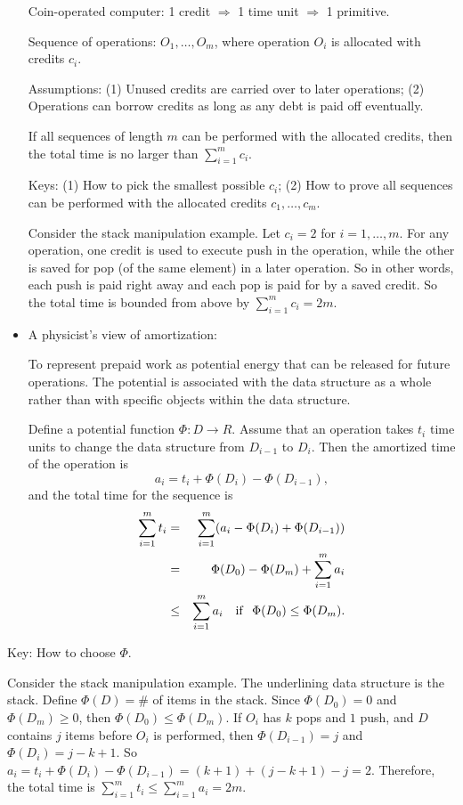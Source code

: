 \documentclass{article}
\begin{document}
\begin{itemize}
Coin-operated computer: 1 credit $\Rightarrow$ 1 time unit
$\Rightarrow$ 1 primitive.

Sequence of operations: $O_1, \ldots, O_m$, where operation $O_i$
is allocated with credits $c_i$.

Assumptions: (1) Unused credits are carried over to later operations;
(2) Operations can borrow credits as long as any debt is paid off
eventually.

If all sequences of length $m$ can be performed with the allocated credits,
then the total time is no larger than $\sum_{i=1}^m c_i$. 

Keys: (1) How to pick the smallest possible $c_i$; (2) How to prove
all sequences can be performed with the allocated credits $c_1,\ldots,c_m$.

Consider the stack manipulation example. Let $c_i=2$ for $i=1,\ldots,m$.
For any operation, one credit is used to execute push in the operation, 
while the other is saved for pop (of the same element) in a later
operation. So in other words, each push is paid right away and each
pop is paid for by a saved credit. So the total time is bounded
from above by $\sum_{i=1}^m c_i=2m$.

\item A physicist's view of amortization:

To represent prepaid work as potential energy that can be released for future
operations. The potential is associated with the data structure as a whole
rather than with specific objects within the data structure.

Define a potential function $\Phi: D\rightarrow R$. Assume that
an operation takes $t_i$ time units to change the data structure
from $D_{i-1}$ to $D_i$. Then the amortized time of the operation is
$$a_i=t_i+\Phi(D_i)-\Phi(D_{i-1}),$$ and the total time for the 
sequence is 
\begin{eqnarray*}
\sum_{i=1}^mt_i&=&\sum_{i=1}^m(a_i-\Phi(D_i)+\Phi(D_{i-1}))\\
&=&\Phi(D_0)-\Phi(D_m)+\sum_{i=1}^ma_i\\
&\le&\sum_{i=1}^ma_i{\rm \quad if\ \ }\Phi(D_0)\le\Phi(D_m).
\end{eqnarray*}
\end{itemize}

Key: How to choose $\Phi$.

Consider the stack manipulation example. The underlining data 
structure is the stack. Define $\Phi(D)=$\# of items in the 
stack. Since $\Phi(D_0)=0$ and $\Phi(D_m)\ge0$, then
$\Phi(D_0)\le\Phi(D_m)$.
If $O_i$ has $k$ pops and $1$ push, and $D$ contains $j$ items 
before $O_i$ is performed, then $\Phi(D_{i-1})=j$ and 
$\Phi(D_i)=j-k+1$. So $a_i=t_i+\Phi(D_i)-\Phi(D_{i-1})=
(k+1)+(j-k+1)-j=2$. Therefore, the total time is
$\sum_{i=1}^mt_i\le\sum_{i=1}^ma_i=2m$.
\end{document}
